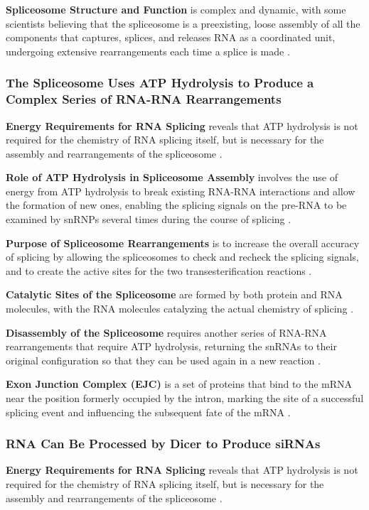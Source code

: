 \textbf{Spliceosome Structure and Function} is complex and dynamic, with some scientists believing that the spliceosome is a preexisting, loose assembly of all the components that captures, splices, and releases RNA as a coordinated unit, undergoing extensive rearrangements each time a splice is made \cite*{L1-Chapter6}.

\subsubsection*{The Spliceosome Uses ATP Hydrolysis to Produce a Complex Series of RNA-RNA Rearrangements}
\textbf{Energy Requirements for RNA Splicing} reveals that ATP hydrolysis is not required for the chemistry of RNA splicing itself, but is necessary for the assembly and rearrangements of the spliceosome \cite*{L1-Chapter6}.

\textbf{Role of ATP Hydrolysis in Spliceosome Assembly} involves the use of energy from ATP hydrolysis to break existing RNA-RNA interactions and allow the formation of new ones, enabling the splicing signals on the pre-RNA to be examined by snRNPs several times during the course of splicing \cite*{L1-Chapter6}.

\textbf{Purpose of Spliceosome Rearrangements} is to increase the overall accuracy of splicing by allowing the spliceosomes to check and recheck the splicing signals, and to create the active sites for the two transesterification reactions \cite*{L1-Chapter6}.

\textbf{Catalytic Sites of the Spliceosome} are formed by both protein and RNA molecules, with the RNA molecules catalyzing the actual chemistry of splicing \cite*{L1-Chapter6}.

\textbf{Disassembly of the Spliceosome} requires another series of RNA-RNA rearrangements that require ATP hydrolysis, returning the snRNAs to their original configuration so that they can be used again in a new reaction \cite*{L1-Chapter6}.

\textbf{Exon Junction Complex (EJC)} is a set of proteins that bind to the mRNA near the position formerly occupied by the intron, marking the site of a successful splicing event and influencing the subsequent fate of the mRNA \cite*{L1-Chapter6}.

\subsubsection*{RNA Can Be Processed by Dicer to Produce siRNAs}
\textbf{Energy Requirements for RNA Splicing} reveals that ATP hydrolysis is not required for the chemistry of RNA splicing itself, but is necessary for the assembly and rearrangements of the spliceosome \cite*{L1-Chapter6}.

